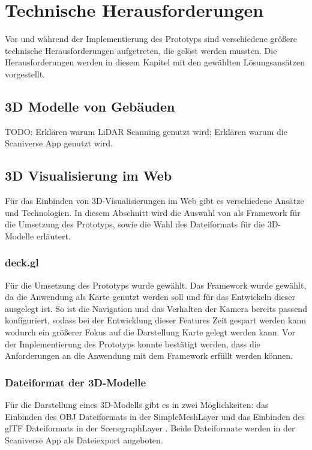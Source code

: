 \newpage
\section{Technische Herausforderungen}
Vor und während der Implementierung des Prototyps sind verschiedene größere technische Herausforderungen aufgetreten, die gelöst werden mussten. Die Herausforderungen werden in diesem Kapitel mit den gewählten Lösungsansätzen vorgestellt. 

\subsection{3D Modelle von Gebäuden}
TODO: Erklären warum LiDAR Scanning genutzt wird; Erklären warum die Scaniverse App genutzt wird.

\subsection{3D Visualisierung im Web}
Für das Einbinden von 3D-Visualisierungen im Web gibt es verschiedene Ansätze und Technologien. In diesem Abschnitt wird die Auswahl von \deckgl{} als Framework für die Umsetzung des Prototyps, sowie die Wahl des Dateiformats für die 3D-Modelle erläutert.

\subsubsection{deck.gl}
Für die Umsetzung des Prototyps wurde \deckgl{} gewählt. Das Framework wurde gewählt, da die Anwendung als Karte genutzt werden soll und \deckgl{} für das Entwickeln dieser ausgelegt ist. So ist die Navigation und das Verhalten der Kamera bereits passend konfiguriert, sodass bei der Entwicklung dieser Features Zeit gespart werden kann wodurch ein größerer Fokus auf die Darstellung Karte gelegt werden kann. Vor der Implementierung des Prototyps konnte bestätigt werden, dass die Anforderungen an die Anwendung mit dem Framework erfüllt werden können.

\subsubsection{Dateiformat der 3D-Modelle}\label{sec:ModelFileFormat}
Für die Darstellung eines 3D-Modells gibt es in \deckgl{} zwei Möglichkeiten: das Einbinden des \ac{OBJ} Dateiformats in der SimpleMeshLayer \cite{DeckglSimpleMeshLayer} und das Einbinden des \ac{glTF} Dateiformats in der ScenegraphLayer \cite{DeckglScenegraphLayer}. Beide Dateiformate werden in der Scaniverse App als Dateiexport angeboten.

